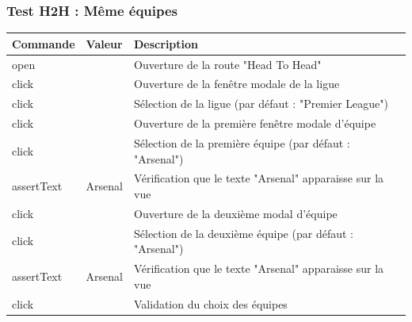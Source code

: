 \documentclass[a4paper,14pt]{extarticle}
\begin{document}
{\subsubsection{Test H2H : Même équipes}

\begin{table}[htp]
    \centering
    \begin{tabular}{|m{4cm}|m{4cm}|m{6cm}|}
    \hline
    \textbf{Commande} & \textbf{Valeur}                                      & \textbf{Description}                                                                    \\ \hline
    open              &                                                      & Ouverture de la route "Head To Head"                                           \\ \hline
    click             &                                                      & Ouverture de la fenêtre modale de la ligue                                              \\ \hline
    click             &                                                      & Sélection de la ligue (par défaut : "Premier League")                                   \\ \hline
    click             &                                                      & Ouverture de la première fenêtre modale d'équipe                                        \\ \hline
    click             &                                                      & Sélection de la première équipe (par défaut : "Arsenal")                                \\ \hline
    assertText        & Arsenal                                              & Vérification que le texte "Arsenal" apparaisse sur la vue                               \\ \hline
    click             &                                                      & Ouverture de la deuxième modal d'équipe                                                 \\ \hline
    click             &                                                      & Sélection de la deuxième équipe (par défaut : "Arsenal")                                \\ \hline
    assertText        & Arsenal                                              & Vérification que le texte "Arsenal" apparaisse sur la vue                               \\ \hline
    click             &                                                      & Validation du choix des équipes                                                         \\ \hline

\end{tabular}
\end{table}}
\end{document}
